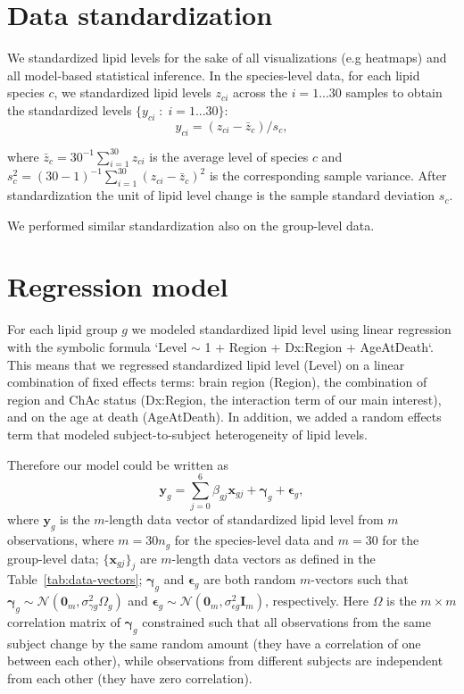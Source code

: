 \documentclass[letterpaper]{article}
\begin{document}
\section{Data standardization}

We standardized lipid levels for the sake of all visualizations (e.g heatmaps) and
all model-based
statistical inference.  In the species-level data, for each lipid species $c$,
we standardized lipid levels $z_{ci}$ across the $i = 1...30$ samples to
obtain the standardized levels $\{y_{ci}\;:\; i = 1...30\}$:
\begin{equation}
	y_{ci} = (z_{ci} - \bar{z}_c) / s_c,
\end{equation}

where $\bar{z}_c = 30^{-1} \sum_{i=1}^{30} z_{ci}$ is the average level of
species $c$ and $s^2_c = (30 - 1)^{-1} \sum_{i=1}^{30} (z_{ci} - \bar{z}_c)^2$
is the corresponding sample variance.  After standardization the unit of lipid
level change is the sample standard deviation $s_c$.

We performed similar standardization also on the group-level data.

\section{Regression model}

For each lipid group $g$ we modeled standardized lipid level using linear
regression with the symbolic formula `Level $\sim$ 1 + Region + Dx:Region +
AgeAtDeath`.  This means that we regressed standardized lipid level (Level) on
a linear combination of fixed effects terms: brain region (Region), the
combination of region and ChAc status (Dx:Region, the interaction term of our
main interest), and on the age at death (AgeAtDeath).  In addition, we added a
random effects term that modeled subject-to-subject heterogeneity of lipid
levels.

Therefore our model could be written as
\begin{equation}
	\mathbf{y}_{g} = \sum_{j=0}^{6} \beta_{gj} \mathbf{x}_{gj} + \mathbf{\gamma}_{g} + \mathbf{\epsilon}_{g},
	\label{eq:main-model}
\end{equation}
where $\mathbf{y}_{g}$ is the $m$-length data vector of standardized lipid
level from $m$ observations, where $m = 30 n_g$ for the species-level data and
$m = 30$ for the group-level data; $\{\mathbf{x}_{gj}\}_j$ are $m$-length
data vectors as defined in the Table~\ref{tab:data-vectors};
$\mathbf{\gamma}_{g}$ and $\mathbf{\epsilon}_{g}$ are both random $m$-vectors
such that
$\mathbf{\gamma}_{g} \sim \mathcal{N}(\mathbf{0}_m, \sigma^2_{\gamma
g}\Omega_g)$ and
$\mathbf{\epsilon}_{g} \sim \mathcal{N}(\mathbf{0}_m, \sigma^2_{\epsilon g}
\mathbf{I}_m)$, respectively.  Here $\Omega$ is the $m \times m$ correlation
matrix of $\mathbf{\gamma}_{g}$ constrained such that all observations from
the same subject change by the same random amount (they have a correlation of
one between each other), while observations from different subjects are
independent from each other (they have zero correlation).
\end{document}
